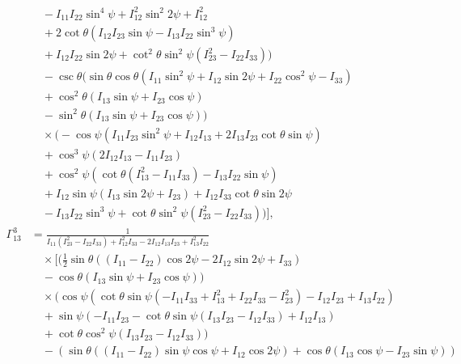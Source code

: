 \documentclass[pdflatex,sn-mathphys-num]{sn-jnl}%
\theoremstyle{thmstyleone}%
\theoremstyle{thmstyletwo}%
\theoremstyle{thmstylethree}%
\begin{document}
\begin{appendices}
\begin{align}
    &\quad -I_{11} I_{22} \sin ^4\psi+I_{12}^2 \sin ^2 2\psi+I_{12}^2 \nonumber \\
    &\quad +2 \cot \theta \left(I_{12} I_{23} \sin \psi-I_{13} I_{22} \sin ^3\psi\right) \nonumber \\
    &\quad +I_{12} I_{22} \sin 2\psi+\cot ^2\theta \sin ^2\psi \left(I_{23}^2-I_{22} I_{33}\right)\bigg) \nonumber \\
    &\quad -\csc \theta \Big(\sin \theta \cos \theta \left(I_{11} \sin ^2\psi+I_{12} \sin 2\psi+I_{22} \cos ^2\psi-I_{33}\right) \nonumber \\
    &\quad +\cos ^2\theta (I_{13} \sin \psi+I_{23} \cos \psi) \nonumber \\
    &\quad -\sin ^2\theta (I_{13} \sin \psi+I_{23} \cos \psi)\Big) \nonumber \\
    &\quad \times \bigg(-\cos \psi \left(I_{11} I_{23} \sin ^2\psi+I_{12} I_{13}+2 I_{13} I_{23} \cot \theta \sin \psi\right) \nonumber \\
    &\quad +\cos ^3\psi (2 I_{12} I_{13}-I_{11} I_{23}) \nonumber \\
    &\quad +\cos ^2\psi \left(\cot \theta \left(I_{13}^2-I_{11} I_{33}\right)-I_{13} I_{22} \sin \psi\right) \nonumber \\
    &\quad +I_{12} \sin \psi (I_{13} \sin 2\psi+I_{23}) +I_{12} I_{33} \cot \theta \sin 2\psi \nonumber \\
    &\quad -I_{13} I_{22} \sin ^3\psi+\cot \theta \sin ^2\psi \left(I_{23}^2-I_{22} I_{33}\right)\bigg) \bigg], \nonumber \\
    \Gamma^{3}_{13} &= \frac{1}{I_{11} \left(I_{23}^2-I_{22} I_{33}\right)+I_{12}^2 I_{33}-2 I_{12} I_{13} I_{23}+I_{13}^2 I_{22}} \nonumber \\
    &\quad \times \bigg[ \bigg(\frac{1}{2} \sin \theta ((I_{11}-I_{22}) \cos 2\psi-2 I_{12} \sin 2\psi+I_{33}) \nonumber \\
    &\quad -\cos \theta (I_{13} \sin \psi+I_{23} \cos \psi)\bigg) \nonumber \\
    &\quad \times \bigg(\cos \psi \left(\cot \theta \sin \psi \left(-I_{11} I_{33}+I_{13}^2+I_{22} I_{33}-I_{23}^2\right)-I_{12} I_{23}+I_{13} I_{22}\right) \nonumber \\
    &\quad +\sin \psi (-I_{11} I_{23}-\cot \theta \sin \psi (I_{13} I_{23}-I_{12} I_{33})+I_{12} I_{13}) \nonumber \\
    &\quad +\cot \theta \cos ^2\psi (I_{13} I_{23}-I_{12} I_{33})\bigg) \nonumber \\
    &\quad -(\sin \theta ((I_{11}-I_{22}) \sin \psi \cos \psi+I_{12} \cos 2\psi)+\cos \theta (I_{13} \cos \psi-I_{23} \sin \psi)) \nonumber \\

\end{align}
\end{appendices}
\end{document}
